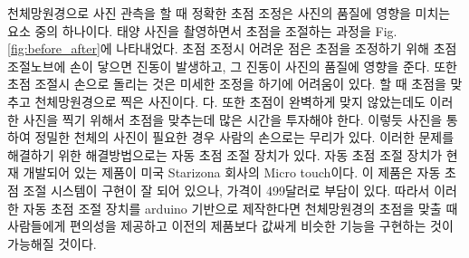 \documentclass{abstract_hutech}
\begin{document}
천체망원경으로 사진 관측을 할 때 정확한 초점 조정은 사진의 품질에 영향을 미치는 요소 중의 하나이다. 태양 사진을 촬영하면서 초점을 조절하는 과정을 Fig. \ref{fig:before_after}에 나타내었다. 초점 조정시 어려운 점은 초점을 조정하기 위해  초점 조절노브에 손이 닿으면 진동이 발생하고, 그 진동이 사진의 품질에 영향을 준다. 또한 초점 조절시 손으로 돌리는 것은 미세한 조정을 하기에 어려움이 있다. 할 때 초점을 맞추고 천체망원경으로 찍은 사진이다. 다. 또한 초점이 완벽하게 맞지 않았는데도 이러한 사진을 찍기 위해서 초점을 맞추는데 많은 시간을 투자해야 한다. 이렇듯 사진을 통하여 정밀한 천체의 사진이 필요한 경우 사람의 손으로는 무리가 있다. 이러한 문제를 해결하기 위한 해결방법으로는 자동 초점 조절 장치가 있다. 자동 초점 조절 장치가 현재 개발되어 있는 제품이 미국 Starizona 회사의 Micro touch이다. 이 제품은 자동 초점 조절 시스템이 구현이 잘 되어 있으나, 가격이 499달러로 부담이 있다. 따라서 이러한 자동 초점 조절 장치를 arduino 기반으로 제작한다면 천체망원경의 초점을 맞출 때 사람들에게 편의성을 제공하고 이전의 제품보다 값싸게 비슷한 기능을 구현하는 것이 가능해질 것이다.
\end{document}
